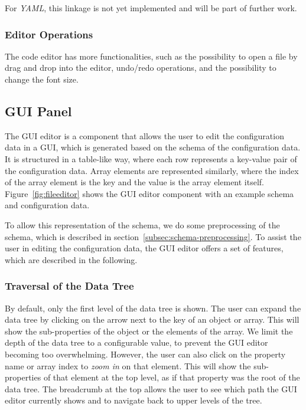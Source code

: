For \textit{YAML}, this linkage is not yet implemented and will be part of further work.

\subsubsection{Editor Operations}
The code editor has more functionalities, such as the possibility to open a file by drag and drop into the editor,
undo/redo operations, and the possibility to change the font size.

\subsection{GUI Panel}\label{subsec:gui-editor}

The GUI editor is a component that allows the user to edit the configuration data in a GUI,
which is generated based on the schema of the configuration data.
It is structured in a table-like way, where each row represents a key-value pair of the configuration data.
Array elements are represented similarly, where the index of the array element is the key and the value is the array element itself.
Figure~\ref{fig:fileeditor} shows the GUI editor component with an example schema and configuration data.


To allow this representation of the schema, we do some preprocessing of the schema,
which is described in section~\ref{subsec:schema-preprocessing}.
To assist the user in editing the configuration data, the GUI editor offers a set of features, which are described in the following.

\subsubsection{Traversal of the Data Tree}
By default, only the first level of the data tree is shown.
The user can expand the data tree by clicking on the arrow next to the key of an object or array.
This will show the sub-properties of the object or the elements of the array.
We limit the depth of the data tree to a configurable value, to prevent the GUI editor becoming too overwhelming.
However, the user can also click on the property name or array index to \textit{zoom in} on that element.
This will show the sub-properties of that element at the top level, as if that property was the root of the data tree.
The breadcrumb at the top allows the user to see which path the GUI editor currently shows and to navigate back to upper levels of the tree.


